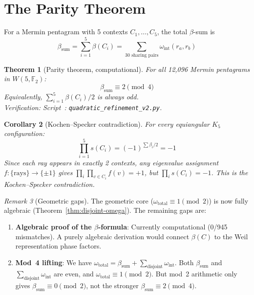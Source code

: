 \documentclass[11pt,a4paper]{article}
\newtheorem{theorem}{Theorem}[section]
\newtheorem{corollary}[theorem]{Corollary}
\theoremstyle{remark}
\newtheorem{remark}[theorem]{Remark}
\newcommand{\F}{\mathbb{F}}
\begin{document}
\section{The Parity Theorem}
\label{sec:parity}

For a Mermin pentagram with 5 contexts $C_1, \ldots, C_5$, the total
$\beta$-sum is
\[
\beta_{\text{sum}} = \sum_{i=1}^5 \beta(C_i)
= \sum_{\text{30 sharing pairs}} \omega_{\text{int}}(r_a, r_b)
\]

\begin{theorem}[Parity theorem, computational]
\label{thm:parity}
  For all 12{,}096 Mermin pentagrams in $W(5, \F_2)$:
  \[
  \beta_{\text{sum}} \equiv 2 \pmod{4}
  \]
  Equivalently, $\sum_{i=1}^5 \beta(C_i)/2$ is always odd.
  \\Verification: Script~\cite{PaperXIsuppl}:
  \texttt{quadratic\_refinement\_v2.py}.
\end{theorem}

\begin{corollary}[Kochen--Specker contradiction]
\label{cor:ks}
  For every equiangular $K_5$ configuration:
  \[
  \prod_{i=1}^5 s(C_i) = (-1)^{\sum \beta_i / 2} = -1
  \]
  Since each ray appears in exactly 2 contexts, any eigenvalue
  assignment $f: \{\text{rays}\} \to \{\pm 1\}$ gives
  $\prod_i \prod_{v \in C_i} f(v) = +1$, but
  $\prod_i s(C_i) = -1$. This is the Kochen--Specker contradiction.
\end{corollary}

\begin{remark}[Geometric gaps]
  The geometric core ($\omega_{\text{total}} \equiv 1 \pmod{2}$) is now
  fully algebraic (Theorem~\ref{thm:disjoint-omega}). The remaining
  gaps are:
  \begin{enumerate}
  \item \textbf{Algebraic proof of the $\beta$-formula}: Currently
    computational (0/945 mismatches). A purely algebraic derivation
    would connect $\beta(C)$ to the Weil representation phase factors.
  \item \textbf{Mod~4 lifting}: We have
    $\omega_{\text{total}} = \beta_{\text{sum}} + \sum_{\text{disjoint}} \omega_{\text{int}}$.
    Both $\beta_{\text{sum}}$ and $\sum_{\text{disjoint}} \omega_{\text{int}}$
    are even, and $\omega_{\text{total}} \equiv 1 \pmod{2}$. But mod~2
    arithmetic only gives $\beta_{\text{sum}} \equiv 0 \pmod{2}$, not
    the stronger $\beta_{\text{sum}} \equiv 2 \pmod{4}$.
  \end{enumerate}
\end{remark}
\end{document}
